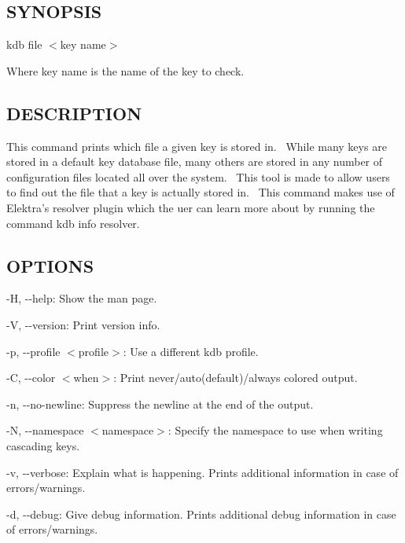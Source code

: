 \subsection*{S\+Y\+N\+O\+P\+S\+IS}

{\ttfamily kdb file $<$key name$>$}~\newline


Where {\ttfamily key name} is the name of the key to check.~\newline


\subsection*{D\+E\+S\+C\+R\+I\+P\+T\+I\+ON}

This command prints which file a given key is stored in.~\newline
 While many keys are stored in a default key database file, many others are stored in any number of configuration files located all over the system.~\newline
 This tool is made to allow users to find out the file that a key is actually stored in.~\newline
 This command makes use of Elektra’s {\ttfamily resolver} plugin which the uer can learn more about by running the command {\ttfamily kdb info resolver}.

\subsection*{O\+P\+T\+I\+O\+NS}


\begin{DoxyItemize}
\item {\ttfamily -\/H}, {\ttfamily -\/-\/help}\+: Show the man page.
\item {\ttfamily -\/V}, {\ttfamily -\/-\/version}\+: Print version info.
\item {\ttfamily -\/p}, {\ttfamily -\/-\/profile $<$profile$>$}\+: Use a different kdb profile.
\item {\ttfamily -\/C}, {\ttfamily -\/-\/color $<$when$>$}\+: Print never/auto(default)/always colored output.
\item {\ttfamily -\/n}, {\ttfamily -\/-\/no-\/newline}\+: Suppress the newline at the end of the output.
\item {\ttfamily -\/N}, {\ttfamily -\/-\/namespace $<$namespace$>$}\+: Specify the namespace to use when writing cascading keys.
\item {\ttfamily -\/v}, {\ttfamily -\/-\/verbose}\+: Explain what is happening. Prints additional information in case of errors/warnings.
\item {\ttfamily -\/d}, {\ttfamily -\/-\/debug}\+: Give debug information. Prints additional debug information in case of errors/warnings.
\end{DoxyItemize}


